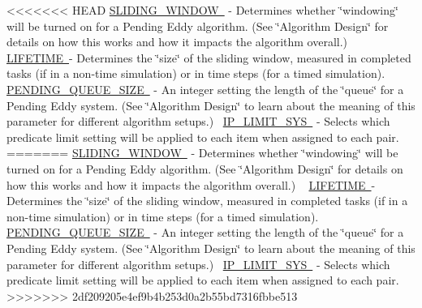 <<<<<<< HEAD
\mbox{\hyperlink{namespacedynamicfilterapp_1_1toggles_adf3c8ab64e62d33397a389d7ba49fe69}{S\+L\+I\+D\+I\+N\+G\+\_\+\+W\+I\+N\+D\+OW }} -\/ Determines whether \char`\"{}windowing\char`\"{} will be turned on for a Pending Eddy algorithm. (See \char`\"{}\+Algorithm Design\char`\"{} for details on how this works and how it impacts the algorithm overall.) ~\newline
 \mbox{\hyperlink{namespacedynamicfilterapp_1_1toggles_a06966aed6fa634825f18ad256f386496}{L\+I\+F\+E\+T\+I\+ME }}-\/ Determines the \char`\"{}size\char`\"{} of the sliding window, measured in completed tasks (if in a non-\/time simulation) or in time steps (for a timed simulation).~\newline
\mbox{\hyperlink{namespacedynamicfilterapp_1_1toggles_a642cb0e1f266db761b270ea65af5425a}{P\+E\+N\+D\+I\+N\+G\+\_\+\+Q\+U\+E\+U\+E\+\_\+\+S\+I\+ZE }} -\/ An integer setting the length of the \char`\"{}queue\char`\"{} for a Pending Eddy system. (See \char`\"{}\+Algorithm Design\char`\"{} to learn about the meaning of this parameter for different algorithm setups.)~\newline
 \mbox{\hyperlink{namespacedynamicfilterapp_1_1toggles_ab27926159525360b29661a4778b0ce7c}{I\+P\+\_\+\+L\+I\+M\+I\+T\+\_\+\+S\+YS }} -\/ Selects which predicate limit setting will be applied to each item when assigned to each pair. ~\newline
=======
\mbox{\hyperlink{}{S\+L\+I\+D\+I\+N\+G\+\_\+\+W\+I\+N\+D\+OW }} -\/ Determines whether \char`\"{}windowing\char`\"{} will be turned on for a Pending Eddy algorithm. (See \char`\"{}\+Algorithm Design\char`\"{} for details on how this works and how it impacts the algorithm overall.) ~\newline
 \mbox{\hyperlink{}{L\+I\+F\+E\+T\+I\+ME }}-\/ Determines the \char`\"{}size\char`\"{} of the sliding window, measured in completed tasks (if in a non-\/time simulation) or in time steps (for a timed simulation).~\newline
\mbox{\hyperlink{}{P\+E\+N\+D\+I\+N\+G\+\_\+\+Q\+U\+E\+U\+E\+\_\+\+S\+I\+ZE }} -\/ An integer setting the length of the \char`\"{}queue\char`\"{} for a Pending Eddy system. (See \char`\"{}\+Algorithm Design\char`\"{} to learn about the meaning of this parameter for different algorithm setups.)~\newline
 \mbox{\hyperlink{}{I\+P\+\_\+\+L\+I\+M\+I\+T\+\_\+\+S\+YS }} -\/ Selects which predicate limit setting will be applied to each item when assigned to each pair. ~\newline
>>>>>>> 2df209205e4ef9b4b253d0a2b55bd7316fbbe513
